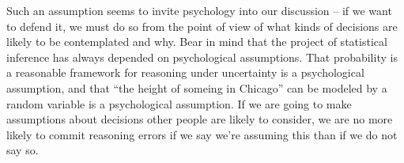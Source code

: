 Such an assumption seems to invite psychology into our discussion -- if we want to defend it, we must do so from the point of view of what kinds of decisions are likely to be contemplated and why. Bear in mind that the project of statistical inference has always depended on psychological assumptions. That probability is a reasonable framework for reasoning under uncertainty is a psychological assumption, and that ``the height of someing in Chicago'' can be modeled by a random variable is a psychological assumption. If we are going to make assumptions about decisions other people are likely to consider, we are no more likely to commit reasoning errors if we say we're assuming this than if we do not say so.